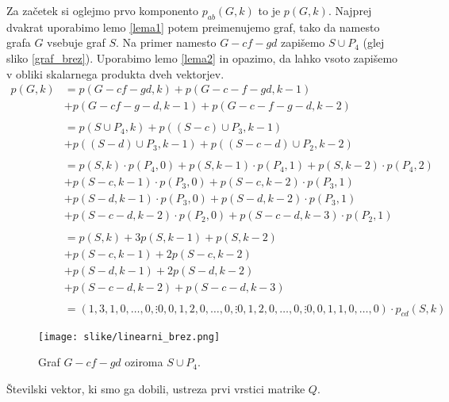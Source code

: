 \documentclass[mat1, tisk]{fmfdelo}
\begin{document}
\begin{dokaz}
  Za začetek si oglejmo prvo komponento $p_{ab}(G,k)$ to je  $p(G,k)$.
  Najprej dvakrat uporabimo lemo \ref{lema1} potem 
  preimenujemo graf, tako da namesto grafa $G$
  vsebuje graf $S$. Na primer namesto $G- cf - gd$ zapišemo
  $S \cup P_4$ (glej sliko \ref{graf_brez}). 
  Uporabimo lemo \ref{lema2} in opazimo, 
  da lahko vsoto zapišemo v obliki skalarnega produkta dveh vektorjev.
  \begin{align*} 
    p(G,k) &= p(G- cf - gd, k) + p(G- c-f - gd, k-1) 
      \\   &+ p(G- cf - g-d, k-1) +p(G- c-f - g-d, k-2)
      \\
      \\  &= p(S \cup P_4,k) + p((S-c) \cup P_3,k-1) 
      \\  &+ p((S-d) \cup P_3,k-1) + p((S-c-d) \cup P_2,k-2) 
      \\
      \\  &= p(S,k) \cdot p(P_4,0) + p(S,k-1) \cdot p(P_4,1) + p(S,k-2) \cdot p(P_4,2)
      \\  &+ p(S-c,k-1) \cdot p(P_3,0) + p(S-c,k-2) \cdot p(P_3,1)   
      \\  &+ p(S-d,k-1) \cdot p(P_3,0) + p(S-d,k-2) \cdot p(P_3,1)
      \\  &+ p(S-c-d,k-2) \cdot p(P_2,0) + p(S-c-d,k-3) \cdot p(P_2,1)
      \\
      \\  &= p(S,k) + 3p(S,k-1) + p(S,k-2)
      \\  &+ p(S-c,k-1)  + 2p(S-c,k-2)   
      \\  &+ p(S-d,k-1)  + 2p(S-d,k-2)
      \\  &+ p(S-c-d,k-2)  + p(S-c-d,k-3)
      \\
      \\ &= (1, 3, 1, 0, \dots ,0, \vdots 0, 0, 1, 2, 0, \dots, 0, \vdots 0, 1, 2, 0, \dots, 0, \vdots 0,0,1,1,0, \dots, 0) \cdot p_{cd}(S,k)
  \end{align*}
  \begin{figure}[h!]
    \centering
    \texttt{[image: slike/linearni\_brez.png]}
    \caption{Graf $G- cf - gd$ oziroma $S \cup P_4$.}
    \label{fig:graf_brez}
  \end{figure}
  Številski vektor, ki smo ga dobili, ustreza prvi vrstici matrike $Q$.
  



\end{dokaz}
\end{document}
